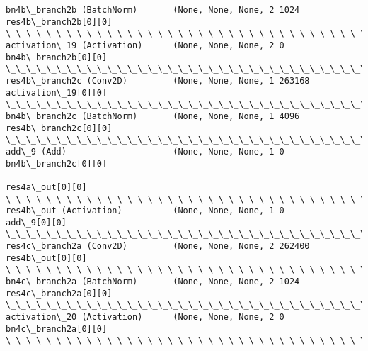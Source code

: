 \documentclass[11pt]{article}
\begin{document}
\begin{Verbatim}[commandchars=\\\{\}]
bn4b\_branch2b (BatchNorm)       (None, None, None, 2 1024        res4b\_branch2b[0][0]             
\_\_\_\_\_\_\_\_\_\_\_\_\_\_\_\_\_\_\_\_\_\_\_\_\_\_\_\_\_\_\_\_\_\_\_\_\_\_\_\_\_\_\_\_\_\_\_\_\_\_\_\_\_\_\_\_\_\_\_\_\_\_\_\_\_\_\_\_\_\_\_\_\_\_\_\_\_\_\_\_\_\_\_\_\_\_\_\_\_\_\_\_\_\_\_\_\_\_
activation\_19 (Activation)      (None, None, None, 2 0           bn4b\_branch2b[0][0]              
\_\_\_\_\_\_\_\_\_\_\_\_\_\_\_\_\_\_\_\_\_\_\_\_\_\_\_\_\_\_\_\_\_\_\_\_\_\_\_\_\_\_\_\_\_\_\_\_\_\_\_\_\_\_\_\_\_\_\_\_\_\_\_\_\_\_\_\_\_\_\_\_\_\_\_\_\_\_\_\_\_\_\_\_\_\_\_\_\_\_\_\_\_\_\_\_\_\_
res4b\_branch2c (Conv2D)         (None, None, None, 1 263168      activation\_19[0][0]              
\_\_\_\_\_\_\_\_\_\_\_\_\_\_\_\_\_\_\_\_\_\_\_\_\_\_\_\_\_\_\_\_\_\_\_\_\_\_\_\_\_\_\_\_\_\_\_\_\_\_\_\_\_\_\_\_\_\_\_\_\_\_\_\_\_\_\_\_\_\_\_\_\_\_\_\_\_\_\_\_\_\_\_\_\_\_\_\_\_\_\_\_\_\_\_\_\_\_
bn4b\_branch2c (BatchNorm)       (None, None, None, 1 4096        res4b\_branch2c[0][0]             
\_\_\_\_\_\_\_\_\_\_\_\_\_\_\_\_\_\_\_\_\_\_\_\_\_\_\_\_\_\_\_\_\_\_\_\_\_\_\_\_\_\_\_\_\_\_\_\_\_\_\_\_\_\_\_\_\_\_\_\_\_\_\_\_\_\_\_\_\_\_\_\_\_\_\_\_\_\_\_\_\_\_\_\_\_\_\_\_\_\_\_\_\_\_\_\_\_\_
add\_9 (Add)                     (None, None, None, 1 0           bn4b\_branch2c[0][0]              
                                                                 res4a\_out[0][0]                  
\_\_\_\_\_\_\_\_\_\_\_\_\_\_\_\_\_\_\_\_\_\_\_\_\_\_\_\_\_\_\_\_\_\_\_\_\_\_\_\_\_\_\_\_\_\_\_\_\_\_\_\_\_\_\_\_\_\_\_\_\_\_\_\_\_\_\_\_\_\_\_\_\_\_\_\_\_\_\_\_\_\_\_\_\_\_\_\_\_\_\_\_\_\_\_\_\_\_
res4b\_out (Activation)          (None, None, None, 1 0           add\_9[0][0]                      
\_\_\_\_\_\_\_\_\_\_\_\_\_\_\_\_\_\_\_\_\_\_\_\_\_\_\_\_\_\_\_\_\_\_\_\_\_\_\_\_\_\_\_\_\_\_\_\_\_\_\_\_\_\_\_\_\_\_\_\_\_\_\_\_\_\_\_\_\_\_\_\_\_\_\_\_\_\_\_\_\_\_\_\_\_\_\_\_\_\_\_\_\_\_\_\_\_\_
res4c\_branch2a (Conv2D)         (None, None, None, 2 262400      res4b\_out[0][0]                  
\_\_\_\_\_\_\_\_\_\_\_\_\_\_\_\_\_\_\_\_\_\_\_\_\_\_\_\_\_\_\_\_\_\_\_\_\_\_\_\_\_\_\_\_\_\_\_\_\_\_\_\_\_\_\_\_\_\_\_\_\_\_\_\_\_\_\_\_\_\_\_\_\_\_\_\_\_\_\_\_\_\_\_\_\_\_\_\_\_\_\_\_\_\_\_\_\_\_
bn4c\_branch2a (BatchNorm)       (None, None, None, 2 1024        res4c\_branch2a[0][0]             
\_\_\_\_\_\_\_\_\_\_\_\_\_\_\_\_\_\_\_\_\_\_\_\_\_\_\_\_\_\_\_\_\_\_\_\_\_\_\_\_\_\_\_\_\_\_\_\_\_\_\_\_\_\_\_\_\_\_\_\_\_\_\_\_\_\_\_\_\_\_\_\_\_\_\_\_\_\_\_\_\_\_\_\_\_\_\_\_\_\_\_\_\_\_\_\_\_\_
activation\_20 (Activation)      (None, None, None, 2 0           bn4c\_branch2a[0][0]              
\_\_\_\_\_\_\_\_\_\_\_\_\_\_\_\_\_\_\_\_\_\_\_\_\_\_\_\_\_\_\_\_\_\_\_\_\_\_\_\_\_\_\_\_\_\_\_\_\_\_\_\_\_\_\_\_\_\_\_\_\_\_\_\_\_\_\_\_\_\_\_\_\_\_\_\_\_\_\_\_\_\_\_\_\_\_\_\_\_\_\_\_\_\_\_\_\_\_

\end{Verbatim}
\end{document}
